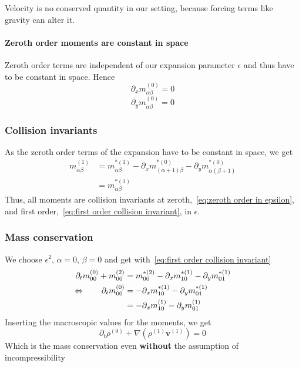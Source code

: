 \documentclass{article}
\begin{document}
Velocity is no conserved quantity in our setting, because forcing terms like gravity can alter it.

\paragraph{Zeroth order moments are constant in space}
\label{par:Zeroth order moments are constant in space}
Zeroth order terms are independent of our expansion parameter $\epsilon$ and thus have to be constant in space. Hence
\begin{equation}
  \partial_x m_{\alpha\beta}^{(0)} = 0
\end{equation}
\begin{equation}
  \partial_y m_{\alpha\beta}^{(0)} = 0
\end{equation}


\subsubsection{Collision invariants}
\label{subs:Collision invariants}
As the zeroth order terms of the expansion have to be constant in space, we get
\begin{equation}
  \label{eq:first order collision invariant}
  \begin{aligned}
    m_{\alpha\beta}^{(1)}
    & = m_{\alpha\beta}^{*(1)}
    - \partial_x m_{(\alpha+1)\beta}^{*(0)}
    - \partial_y m_{\alpha(\beta+1)}^{*(0)} \\
    & = m_{\alpha\beta}^{*(1)}
  \end{aligned}
\end{equation}
Thus, all moments are collision invariants at zeroth,~\eqref{eq:zeroth order in epsilon}, and first order,~\eqref{eq:first order collision invariant}, in $\epsilon$.

\subsubsection{Mass conservation}
\label{subs:Mass conservation}

We choose $\epsilon^2$, $\alpha=0$, $\beta=0$ and get with~\eqref{eq:first order collision invariant}
\begin{equation}
    \begin{aligned}
      \partial_t m_{00}^{(0)} + m_{00}^{(2)} & =  m_{00}^{*(2)} - \partial_x m_{10}^{*(1)} - \partial_y m_{01}^{*(1)} \\
      \Leftrightarrow \qquad \partial_t m_{00}^{(0)} & =  - \partial_x m_{10}^{*(1)} - \partial_y m_{01}^{*(1)} \\
      & =  - \partial_x m_{10}^{(1)} - \partial_y m_{01}^{(1)}
    \end{aligned}
\end{equation}
Inserting the macroscopic values for the moments, we get
\begin{equation}
  \partial_t \rho^{(0)} + \nabla (\rho^{(1)} \mathbf{v}^{(1)}) = 0
\end{equation}
Which is the mass conservation even \textbf{without} the assumption of incompressibility
\end{document}
